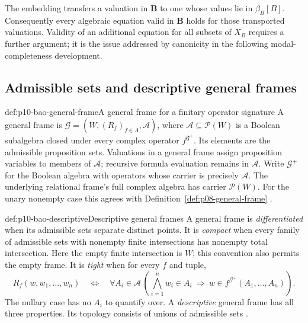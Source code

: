 The embedding transfers a valuation in \(\mathbf B\) to one whose
values lie in \(\beta_B[B]\).
Consequently every algebraic equation valid in \(\mathbf B\)
holds for those transported valuations.
Validity of an additional equation for all subsets of \(X_B\)
requires a further argument; it is the issue addressed by
canonicity in the following modal-completeness development.

\subsection{Admissible sets and descriptive general frames}
\label{sec:p10-bao-general-frames}

\begin{hbdefinition}{def:p10-bao-general-frame}{A general frame for a finitary operator signature}
A general frame is
\(\mathcal G=(W,(R_f)_{f\in\Lambda},\mathcal A)\), where
\(\mathcal A\subseteq\mathcal P(W)\) is a Boolean subalgebra
closed under every complex operator \(f^{\mathfrak F^+}\).
Its elements are the admissible proposition sets.
Valuations in a general frame assign proposition variables to
members of \(\mathcal A\); recursive formula evaluation remains
in \(\mathcal A\).
Write \(\mathcal G^+\) for the Boolean algebra with operators
whose carrier is precisely \(\mathcal A\).
The underlying relational frame's full complex algebra has
carrier \(\mathcal P(W)\).
For the unary nonempty case this agrees with
Definition~\ref{def:p08-general-frame}
\cite[preprint Definition~5.24, p.~22]{Venema2005Preprint}.
\end{hbdefinition}

\begin{hbdefinition}{def:p10-bao-descriptive}{Descriptive general frames}
A general frame is \emph{differentiated} when its admissible sets
separate distinct points.
It is \emph{compact} when every family of admissible sets with
nonempty finite intersections has nonempty total intersection.
Here the empty finite intersection is \(W\); this convention
also permits the empty frame.
It is \emph{tight} when for every \(f\) and tuple,
\[
 R_f(w,w_1,\ldots,w_n)
 \quad\Longleftrightarrow\quad
 \forall A_i\in\mathcal A\,
 \left(\bigwedge_{i=1}^n w_i\in A_i
       \ \Longrightarrow\
       w\in f^{\mathcal G^+}(A_1,\ldots,A_n)\right).
\]
The nullary case has no \(A_i\) to quantify over.
A \emph{descriptive} general frame has all three properties.
Its topology consists of unions of admissible sets
\cite[preprint Definition~5.25, p.~22]{Venema2005Preprint}.
\end{hbdefinition}

